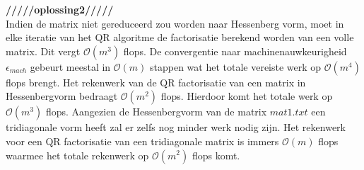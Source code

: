 \documentclass[a4paper]{article}
\begin{document}
\textbf{/////oplossing2/////}\\
Indien de matrix niet gereduceerd zou worden naar Hessenberg vorm, moet in elke iteratie van het QR algoritme de factorisatie berekend worden van een volle matrix. Dit vergt $\mathcal{O}(m^{3})$ flops. De convergentie naar machinenauwkeurigheid $\epsilon _{mach}$ gebeurt meestal in $\mathcal{O}(m)$ stappen wat het totale vereiste werk op $\mathcal{O}(m^{4})$ flops brengt. Het rekenwerk van de QR factorisatie van een matrix in Hessenbergvorm bedraagt $\mathcal{O}(m^{2})$ flops. Hierdoor komt het totale werk op $\mathcal{O}(m^{3})$ flops. Aangezien de Hessenbergvorm van de matrix $mat1.txt$ een tridiagonale vorm heeft zal er zelfs nog minder werk nodig zijn. Het rekenwerk voor een QR factorisatie van een tridiagonale matrix is immers $\mathcal{O}(m)$ flops waarmee het totale rekenwerk op $\mathcal{O}(m^{2})$ flops komt.
\end{document}
